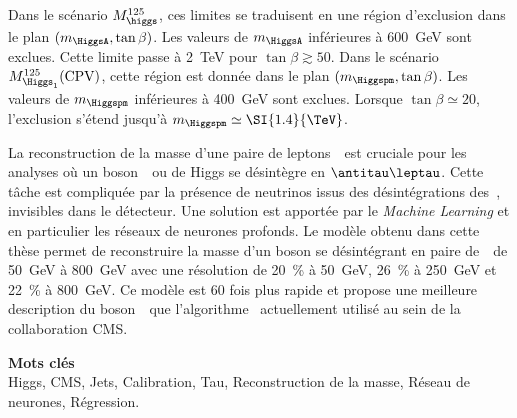 Dans le scénario $M_{\higgs}^{125}$,
ces limites se traduisent en une région d'exclusion dans le plan $(m_{\HiggsA},\tan\beta)$.
Les valeurs de $m_{\HiggsA}$ inférieures à \SI{600}{\GeV} sont exclues.
Cette limite passe à
\SI{2}{\TeV} pour $\tan\beta\gtrsim\num{50}$.
Dans le scénario $M_{\Higgs_1}^{125}(\text{CPV})$,
cette région est donnée dans le plan $(m_{\Higgspm},\tan\beta)$.
Les valeurs de $m_{\Higgspm}$ inférieures à \SI{400}{\GeV} sont exclues.
Lorsque
$\tan\beta\simeq\num{20}$,
l'exclusion s'étend jusqu'à
$m_{\Higgspm} \simeq \SI{1.4}{\TeV}$.
\par
La reconstruction de la masse d'une paire de leptons~\tau\
est cruciale pour les analyses
où un boson~\Zboson\ ou de Higgs se désintègre en $\antitau\leptau$.
Cette tâche est compliquée par la présence de neutrinos issus des désintégrations des~\tau,
invisibles dans le détecteur.
Une solution est apportée par
le \emph{Machine Learning}
et en particulier les réseaux de neurones profonds.
Le modèle obtenu dans cette thèse permet
de reconstruire la masse d'un boson se désintégrant en paire de~\tau\
de \SI{50}{\GeV} à \SI{800}{\GeV}
avec une résolution de
\SI{20}{\%} à \SI{50}{\GeV},
\SI{26}{\%} à \SI{250}{\GeV} et
\SI{22}{\%} à \SI{800}{\GeV}.
Ce modèle est
60 fois plus rapide
et propose une meilleure description du boson~\Zboson\
que l'algorithme \SVFIT\ actuellement utilisé au sein de la collaboration CMS.

\vfill

\textbf{\Large Mots clés}\\
Higgs,
CMS,
Jets,
Calibration,
Tau,
Reconstruction de la masse,
Réseau de neurones,
Régression.

\vfill